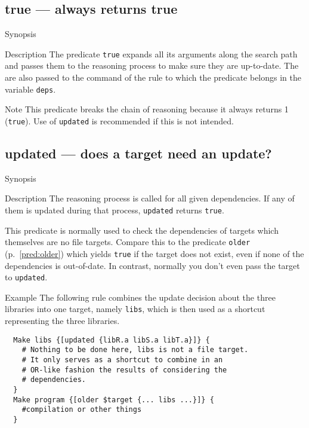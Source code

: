 \documentclass[11pt,bibtotoc,idxtotoc]{scrreprt}
\makeatletter
\newcommand{\indextt}[1]{\index{#1@\texttt{#1}}}
\makeatother
\begin{document}
\subsection{true --- always returns true}
\indextt{true}
\begin{Describe}
\item[Synopsis]  
\item[Description] The predicate \texttt{true} expands all its
  arguments along the search path and passes them to the reasoning
  process to make sure they are up-to-date. The are also passed to the
  command of the rule to which the predicate belongs in the variable
  \texttt{deps}.
\item[Note] This predicate breaks the chain of reasoning because it
  always returns 1 (\texttt{true}). Use of \texttt{updated} is
  recommended if this is not intended.
\end{Describe}

\subsection{updated --- does a target need an update?}

\label{pred:updated}
\begin{Describe}
\item[Synopsis]  
\item[Description] The reasoning process is called for all given
  dependencies. If any of them is updated during that process,
  \texttt{updated} returns \texttt{true}. 
  
  This predicate is normally used to check the dependencies of targets
  which themselves are no file targets. Compare this to the predicate
  \texttt{older} (p.~\ref{pred:older}) which yields \texttt{true} if
  the target does not exist, even if none of the dependencies is
  out-of-date. In contrast, normally you don't even pass the target to
  \texttt{updated}.
  
\item[Example] The following rule combines the update decision about
  the three libraries into one target, namely \texttt{libs}, which is
  then used as a shortcut representing the three libraries.
\begin{verbatim}
  Make libs {[updated {libR.a libS.a libT.a}]} {
    # Nothing to be done here, libs is not a file target. 
    # It only serves as a shortcut to combine in an 
    # OR-like fashion the results of considering the 
    # dependencies.
  }
  Make program {[older $target {... libs ...}]} {
    #compilation or other things
  }
\end{verbatim}

\end{Describe}
\end{document}
